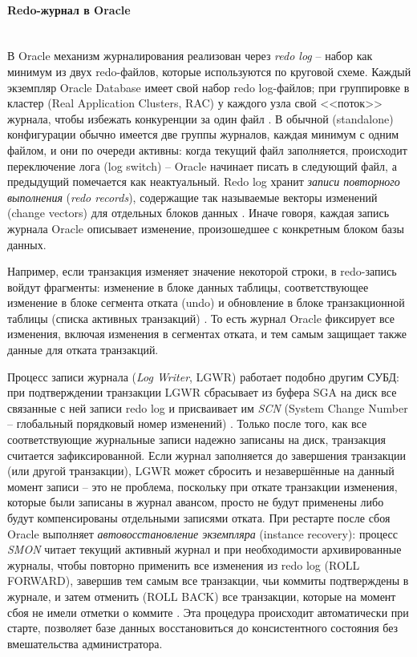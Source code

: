  \paragraph{Redo-журнал в Oracle} ~\\
 
 В Oracle механизм журналирования реализован через \textit{redo log} – набор как минимум из двух redo-файлов, которые используются по круговой схеме. Каждый экземпляр Oracle Database имеет свой набор redo log-файлов; при группировке в кластер (Real Application Clusters, RAC) у каждого узла свой <<поток>> журнала, чтобы избежать конкуренции за один файл \autocite{OracleRedoLog}. В обычной (standalone) конфигурации обычно имеется две группы журналов, каждая минимум с одним файлом, и они по очереди активны: когда текущий файл заполняется, происходит переключение лога (log switch) – Oracle начинает писать в следующий файл, а предыдущий помечается как неактуальный. Redo log хранит \textit{записи повторного выполнения} (\textit{redo records}), содержащие так называемые векторы изменений (change vectors) для отдельных блоков данных \autocite{OracleRedoLog}. Иначе говоря, каждая запись журнала Oracle описывает изменение, произошедшее с конкретным блоком базы данных. 
 
 Например, если транзакция изменяет значение некоторой строки, в redo-запись войдут фрагменты: изменение в блоке данных таблицы, соответствующее изменение в блоке сегмента отката (undo) и обновление в блоке транзакционной таблицы (списка активных транзакций) \autocite{OracleRedoLog}. То есть журнал Oracle фиксирует все изменения, включая изменения в сегментах отката, и тем самым защищает также данные для отката транзакций.
 
 Процесс записи журнала (\textit{Log Writer}, LGWR) работает подобно другим СУБД: при подтверждении транзакции LGWR сбрасывает из буфера SGA на диск все связанные с ней записи redo log и присваивает им \textit{SCN} (System Change Number – глобальный порядковый номер изменений) \autocite{OracleRedoLog}. Только после того, как все соответствующие журнальные записи надежно записаны на диск, транзакция считается зафиксированной. Если журнал заполняется до завершения транзакции (или другой транзакции), LGWR может сбросить и незавершённые на данный момент записи – это не проблема, поскольку при откате транзакции изменения, которые были записаны в журнал авансом, просто не будут применены либо будут компенсированы отдельными записями отката. При рестарте после сбоя Oracle выполняет \textit{автовосстановление экземпляра} (instance recovery): процесс \textit{SMON} читает текущий активный журнал и при необходимости архивированные журналы, чтобы повторно применить все изменения из redo log (ROLL FORWARD), завершив тем самым все транзакции, чьи коммиты подтверждены в журнале, и затем отменить (ROLL BACK) все транзакции, которые на момент сбоя не имели отметки о коммите \autocite{OracleRedoLog}. Эта процедура происходит автоматически при старте, позволяет базе данных восстановиться до консистентного состояния без вмешательства администратора.

